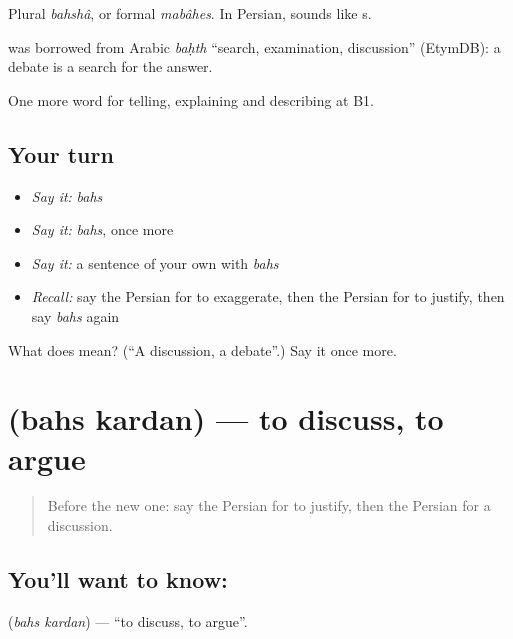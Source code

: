 Plural \emph{bahshâ}, or formal \emph{mabâhes}. In Persian,  sounds like s.

\begin{cousinweb}
\textbf{} was borrowed from Arabic \emph{baḥth} \textquotedblleft{}search, examination, discussion\textquotedblright{} (EtymDB): a debate is a search for the answer.
\end{cousinweb}

\begin{grammarlens}[title={What you've built}]
One more word for telling, explaining and describing at B1.
\end{grammarlens}

\subsection*{Your turn}
\begin{itemize}
\raggedright
  \item \emph{Say it:} \emph{bahs}
  \item \emph{Say it:} \emph{bahs}, once more
  \item \emph{Say it:} a sentence of your own with \emph{bahs}
  \item \emph{Recall:} say the Persian for to exaggerate, then the Persian for to justify, then say \emph{bahs} again
\end{itemize}

\begin{tcolorbox}[breakable,colback=teal!4,colframe=teal!35!black,title={Before you move on}]
What does  mean? (\textquotedblleft{}A discussion, a debate\textquotedblright{}.) Say it once more.
\end{tcolorbox}
\section[\texorpdfstring{\fa{بحث} \fa{کردن} (bahs kardan)}{بحث کردن (bahs kardan)}]{  (bahs kardan) — to discuss, to argue}

\label{lesson:FA-C366-bahs-kardan}



\begin{quote}
Before the new one: say the Persian for to justify, then the Persian for a discussion.
\end{quote}

\subsection*{You'll want to know:  }
\textbf{ } (\emph{bahs kardan}) — \textquotedblleft{}to discuss, to argue\textquotedblright{}.

